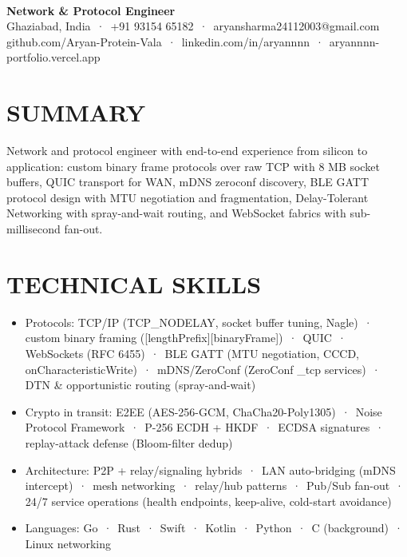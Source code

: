 \documentclass[9pt]{article}
\begin{document}
\\[3pt]
{\large\bfseries Network \& Protocol Engineer}\\[3pt]
{\small\color{greyc} Ghaziabad, India \,·\, +91 93154 65182 \,·\, aryansharma24112003@gmail.com}\vspace{-2pt}
{\small\color{greyc} github.com/Aryan-Protein-Vala \,·\, linkedin.com/in/aryannnn \,·\, aryannnn-portfolio.vercel.app}\vspace{-2pt}
\section*{SUMMARY}
Network and protocol engineer with end-to-end experience from silicon to application: custom binary frame protocols over raw TCP with 8 MB socket buffers, QUIC transport for WAN, mDNS zeroconf discovery, BLE GATT protocol design with MTU negotiation and fragmentation, Delay-Tolerant Networking with spray-and-wait routing, and WebSocket fabrics with sub-millisecond fan-out.
\vspace{1pt}
\section*{TECHNICAL SKILLS}
\begin{itemize}[leftmargin=11pt,itemsep=0pt,topsep=1pt,parsep=0pt]
\item Protocols: TCP/IP (TCP\_NODELAY, socket buffer tuning, Nagle) \,·\, custom binary framing ([lengthPrefix][binaryFrame]) \,·\, QUIC \,·\, WebSockets (RFC 6455) \,·\, BLE GATT (MTU negotiation, CCCD, onCharacteristicWrite) \,·\, mDNS/ZeroConf (ZeroConf \_tcp services) \,·\, DTN \& opportunistic routing (spray-and-wait)
\item Crypto in transit: E2EE (AES-256-GCM, ChaCha20-Poly1305) \,·\, Noise Protocol Framework \,·\, P-256 ECDH + HKDF \,·\, ECDSA signatures \,·\, replay-attack defense (Bloom-filter dedup)
\item Architecture: P2P + relay/signaling hybrids \,·\, LAN auto-bridging (mDNS intercept) \,·\, mesh networking \,·\, relay/hub patterns \,·\, Pub/Sub fan-out \,·\, 24/7 service operations (health endpoints, keep-alive, cold-start avoidance)
\item Languages: Go \,·\, Rust \,·\, Swift \,·\, Kotlin \,·\, Python \,·\, C (background) \,·\, Linux networking
\end{itemize}
\end{document}
